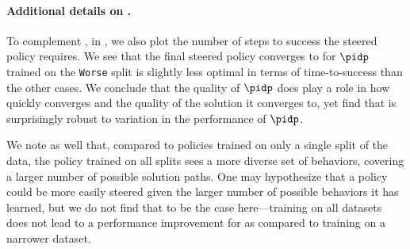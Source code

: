 \paragraph{Additional details on .}


To complement , in , we also plot the number of steps to success the steered policy requires.
We see that the final steered policy \algname converges to for $\pidp$ trained on the \texttt{Worse} split is slightly less optimal in terms of time-to-success than the other cases. We conclude that the quality of $\pidp$ does play a role in how quickly \algname converges and the quality of the solution it converges to, yet find that \algname is surprisingly robust to variation in the performance of $\pidp$.

We note as well that, compared to policies trained on only a single split of the data, the policy trained on all splits sees a more diverse set of behaviors, covering a larger number of possible solution paths. One may hypothesize that a policy could be more easily steered given the larger number of possible behaviors it has learned, but we do not find that to be the case here---training on all datasets does not lead to a performance improvement for \algname as compared to training on a narrower dataset.










